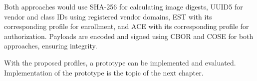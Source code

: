 \documentclass[0-thesis.tex]{subfiles}
\begin{document}
Both approaches would use SHA-256 for calculating image digests, UUID5 for vendor and
class IDs using registered vendor domains, EST with its corresponding profile for
enrollment, and ACE with its corresponding profile for authorization. Payloads are encoded
and signed using CBOR and COSE for both approaches, ensuring integrity.

With the proposed profiles, a prototype can be implemented and evaluated. Implementation
of the prototype is the topic of the next chapter.
\end{document}
